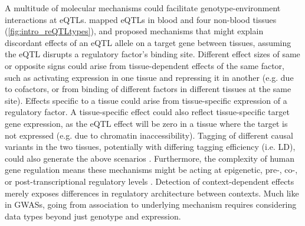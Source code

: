 A multitude of molecular mechanisms could facilitate genotype-environment interactions at \glspl{eQTL}.
\textcite{fu2012UnravelingRegulatoryMechanisms} mapped \glspl{eQTL} in blood and four non-blood tissues (\cref{fig:intro_reQTLtypes}), 
and proposed mechanisms that might explain discordant effects of an \gls{eQTL} allele on a target gene between tissues,
assuming the \gls{eQTL} disrupts a regulatory factor's binding site.
Different effect sizes of same or opposite signs could arise 
from tissue-dependent effects of the same factor, such as activating expression in one tissue and repressing it in another 
(e.g. due to cofactors, or from binding of different factors in different tissues at the same site).
Effects specific to a tissue could arise from tissue-specific expression of a regulatory factor.
A tissue-specific effect could also reflect tissue-specific target gene expression,
as the \gls{eQTL} effect will be zero in a tissue where the target is not expressed (e.g. due to chromatin inaccessibility).
Tagging of different causal variants in the two tissues, potentially with differing tagging efficiency (i.e. \gls{LD}), could also generate the above scenarios \autocite{fu2012UnravelingRegulatoryMechanisms}.
Furthermore, the complexity of human gene regulation means these mechanisms might be acting at epigenetic, pre-, co-, or post-transcriptional regulatory levels \autocite{gaffney2013GlobalPropertiesFunctional}.
Detection of context-dependent effects merely exposes differences in regulatory architecture between contexts.
Much like in \glspl{GWAS}, going from association to underlying mechanism requires considering data types beyond just genotype and expression.

